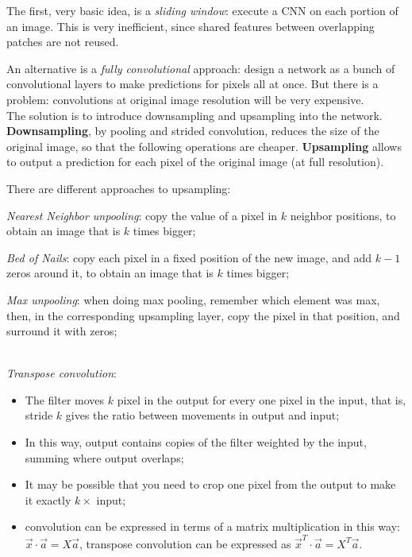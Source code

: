 The first, very basic idea, is a \textit{sliding window}: execute a CNN on each portion of an image. This is very inefficient, since shared features between overlapping patches are not reused.

An alternative is a \textit{fully convolutional} approach: design a network as a bunch of convolutional layers to make predictions for pixels all at once. But there is a problem: convolutions at original image resolution will be very expensive.\\
The solution is to introduce downsampling and upsampling into the network. \textbf{Downsampling}, by pooling and strided convolution, reduces the size of the original image, so that the following operations are cheaper. \textbf{Upsampling} allows to output a prediction for each pixel of the original image (at full resolution).

There are different approaches to upsampling:
\begin{myitem}
    \item \textit{Nearest Neighbor unpooling}: copy the value of a pixel in $k$ neighbor positions, to obtain an image that is $k$ times bigger;
    \item \textit{Bed of Nails}: copy each pixel in a fixed position of the new image, and add $k-1$ zeros around it, to obtain an image that is $k$ times bigger;
    \item \textit{Max unpooling}: when doing max pooling, remember which element was max, then, in the corresponding upsampling layer, copy the pixel in that position, and surround it with zeros;\\\\
    \item \textit{Transpose convolution}:
    \begin{itemize}
        \item The filter moves $k$ pixel in the output for every one pixel in the input, that is, stride $k$ gives the ratio between movements in output and input;
        \item In this way, output contains copies of the filter weighted by the input, summing where output overlaps;
        \item It may be possible that you need to crop one pixel from the output to make it exactly $k \times$ input;
        \item convolution can be expressed in terms of a matrix multiplication in this way: $\vec{x} \cdot \vec{a} = X \vec{a}$, transpose convolution can be expressed as $\vec{x}^T \cdot \vec{a} = X^T \vec{a}$.
    \end{itemize}
\end{myitem}

